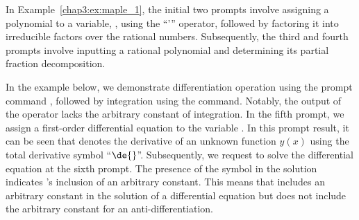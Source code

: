 %
In Example~\ref{chap3:ex:maple_1}, the initial two prompts involve assigning a polynomial to a variable, , using the ``'\code{:=}'' operator, followed by factoring it into irreducible factors over the rational numbers. Subsequently, the third and fourth prompts involve inputting a rational polynomial and determining its partial fraction decomposition.

In the example below, we demonstrate differentiation operation using the prompt command , followed by integration using the  command. Notably, the output of the  operator lacks the arbitrary constant of integration. In the fifth prompt, we assign a first-order differential equation to the variable . In this prompt result, it can be seen that \Maple{} denotes the derivative of an unknown function $y(x)$ using the total derivative symbol ``$\de{}$''. Subsequently, we request \Maple{} to solve the differential equation at the sixth prompt. The presence of the symbol  in the solution indicates \Maple{}'s inclusion of an arbitrary constant. This means that \Maple{} includes an arbitrary constant in the solution of a differential equation but does not include the arbitrary constant for an anti-differentiation.
%
